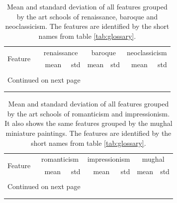 \documentclass[11pt,a4paper,twoside,openright]{report}
\begin{document}
\begin{center}
\footnotesize
\begin{longtable}{l|rr|rr|rr}
\toprule
\multirow{2}{*}{Feature}
  & \multicolumn{2}{c}{renaissance}
  & \multicolumn{2}{c}{baroque}
  & \multicolumn{2}{c}{neoclassicism}
  \\
\cline{2-7}
& mean & std & mean & std & mean & std \\
\midrule
\endhead

\midrule
\multicolumn{3}{r}{} \\
\multicolumn{3}{r}{{Continued on next page}} \\
\multicolumn{3}{r}{} \\
\midrule
\endfoot

\bottomrule
\caption[Feature values (first half)]{Mean and standard deviation of all
features grouped by the art schools of renaissance, baroque and neoclassicism.
The features are identified by the short names from table \ref{tab:glossary}.}
\label{tab:bigtop}
\endlastfoot


\bottomrule
\end{longtable}
\end{center}

\newpage

\begin{center}
\footnotesize
\begin{longtable}{l|rr|rr||rr}
\toprule
\multirow{2}{*}{Feature}
  & \multicolumn{2}{c}{romanticism}
  & \multicolumn{2}{c}{impressionism}
  & \multicolumn{2}{c}{mughal}
  \\
\cline{2-7}
& mean & std & mean & std & mean & std \\
\midrule
\endhead

\midrule
\multicolumn{3}{r}{} \\
\multicolumn{3}{r}{{Continued on next page}} \\
\multicolumn{3}{r}{} \\
\midrule
\endfoot

\bottomrule
\caption[Feature values (second half)]{Mean and standard deviation of all
features grouped by the art schools of romanticism and impressionism.  It also
shows the same features grouped by the mughal miniature paintings.  The
features are identified by the short names from table \ref{tab:glossary}.}
\label{tab:bigbot}
\endlastfoot


\bottomrule
\end{longtable}
\end{center}
\end{document}
